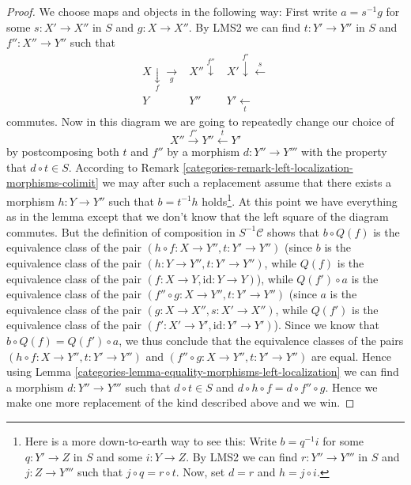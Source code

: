 \begin{proof}

We choose maps and objects in the following way:
First write $a = s^{-1}g$ for some $s : X' \to X''$ in $S$ and
$g : X \to X''$. By LMS2 we can find $t : Y' \to Y''$ in $S$ and
$f'' : X'' \to Y''$ such that
$$
\begin{array}{ccc}X \underset{f}{\downarrow}\underset{g}{\longrightarrow} & X'' \overset{f''}{\downarrow} & X' \overset{f'}{\downarrow}\overset{s}{\longleftarrow} \\ Y & Y'' & Y' \underset{t}{\longleftarrow}\end{array}
$$
commutes. Now in this diagram we are going to repeatedly change our
choice of
$$
X'' \xrightarrow{f''} Y'' \xleftarrow{t} Y'
$$
by postcomposing both $t$ and $f''$ by a morphism $d : Y'' \to Y'''$
with the property that $d \circ t \in S$. According to
Remark \ref{categories-remark-left-localization-morphisms-colimit}
we may after such a replacement assume that there exists a morphism
$h : Y \to Y''$ such that $b = t^{-1}h$ holds\footnote{Here is a
more down-to-earth way to see this:
Write $b = q^{-1}i$ for some $q : Y' \to Z$ in $S$ and some
$i : Y \to Z$. By LMS2 we can find $r : Y'' \to Y'''$ in $S$ and
$j : Z \to Y'''$ such that $j \circ q = r \circ t$. Now, set
$d = r$ and $h = j \circ i$.}. At this point we have everything
as in the lemma except that we don't know that the left square of the
diagram commutes.
But the definition of composition in $S^{-1} \mathcal{C}$ shows that
$b \circ Q\left(f\right)$ is the equivalence class of the pair
$(h \circ f : X \to Y'', t : Y' \to Y'')$ (since $b$ is the
equivalence class of the pair $(h : Y \to Y'', t : Y' \to Y'')$,
while $Q\left(f\right)$ is the equivalence class of the pair
$(f : X \to Y, \text{id} : Y \to Y)$), while
$Q\left(f'\right) \circ a$ is the equivalence class of the pair
$(f'' \circ g : X \to Y'', t : Y' \to Y'')$ (since $a$ is the
equivalence class of the pair $(g : X \to X'', s : X' \to X'')$,
while $Q\left(f'\right)$ is the equivalence class of the pair
$(f' : X' \to Y', \text{id} : Y' \to Y')$).
Since we know that
$b \circ Q\left(f\right) = Q\left(f'\right) \circ a$, we thus
conclude that the equivalence classes of the pairs
$(h \circ f : X \to Y'', t : Y' \to Y'')$ and
$(f'' \circ g : X \to Y'', t : Y' \to Y'')$ are equal.
Hence using
Lemma \ref{categories-lemma-equality-morphisms-left-localization}
we can find a morphism $d : Y'' \to Y'''$ such that
$d \circ t \in S$ and $d \circ h \circ f = d \circ f'' \circ g$.
Hence we make one more replacement of the kind described
above and we win.
\end{proof}

